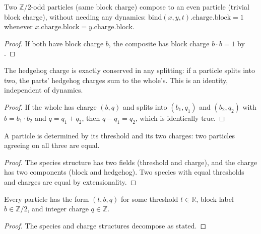 \begin{theorem}
Two $\mathbb{Z}/2$-odd particles (same block charge) compose to an even particle (trivial block charge), without needing any dynamics: $\mathrm{bind}(x, y, t).\mathrm{charge}.\mathrm{block} = 1$ whenever $x.\mathrm{charge}.\mathrm{block} = y.\mathrm{charge}.\mathrm{block}$.
\end{theorem}

\begin{proof}
If both have block charge $b$, the composite has block charge $b \cdot b = 1$ by .
\end{proof}

\begin{theorem}
The hedgehog charge is exactly conserved in any splitting: if a particle splits into two, the parts' hedgehog charges sum to the whole's. This is an identity, independent of dynamics.
\end{theorem}

\begin{proof}
If the whole has charge $(b, q)$ and splits into $(b_1, q_1)$ and $(b_2, q_2)$ with $b = b_1 \cdot b_2$ and $q = q_1 + q_2$, then $q - q_1 = q_2$, which is identically true.
\end{proof}

\begin{theorem}
A particle is determined by its threshold and its two charges: two particles agreeing on all three are equal.
\end{theorem}

\begin{proof}
The species structure has two fields (threshold and charge), and the charge has two components (block and hedgehog). Two species with equal thresholds and charges are equal by extensionality.
\end{proof}

\begin{theorem}
Every particle has the form $(t, b, q)$ for some threshold $t \in \mathbb{R}$, block label $b \in \mathbb{Z}/2$, and integer charge $q \in \mathbb{Z}$.
\end{theorem}

\begin{proof}
The species and charge structures decompose as stated.
\end{proof}

